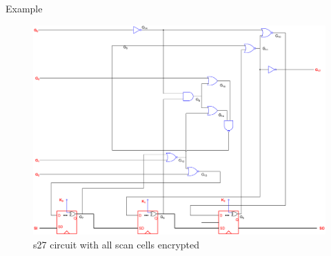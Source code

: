 
\begin{frame}{Example}
\begin{figure}
\begin{center}
\caption{s27 circuit with all scan cells encrypted}
\label{fig:s27}
\includegraphics[scale=0.15]{fig/s27.pdf}
\end{center}
\end{figure}
\end{frame}

